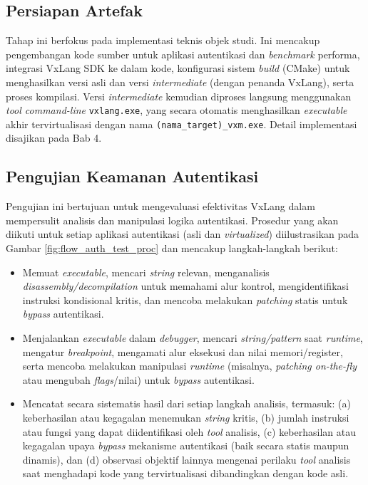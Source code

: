 \subsection{Persiapan Artefak}
Tahap ini berfokus pada implementasi teknis objek studi. Ini mencakup pengembangan kode sumber untuk aplikasi autentikasi dan \textit{benchmark} performa, integrasi VxLang SDK ke dalam kode, konfigurasi sistem \textit{build} (CMake) untuk menghasilkan versi asli dan versi \textit{intermediate} (dengan penanda VxLang), serta proses kompilasi. Versi \textit{intermediate} kemudian diproses langsung menggunakan \textit{tool command-line} \texttt{vxlang.exe}, yang secara otomatis menghasilkan \textit{executable} akhir tervirtualisasi dengan nama \texttt{(nama\_target)\_vxm.exe}. Detail implementasi disajikan pada Bab 4.

\subsection{Pengujian Keamanan Autentikasi}
Pengujian ini bertujuan untuk mengevaluasi efektivitas VxLang dalam mempersulit analisis dan manipulasi logika autentikasi. Prosedur yang akan diikuti untuk setiap aplikasi autentikasi (asli dan \textit{virtualized}) diilustrasikan pada Gambar \ref{fig:flow_auth_test_proc} dan mencakup langkah-langkah berikut:
\begin{itemize}
    \item {} Memuat \textit{executable}, mencari \textit{string} relevan, menganalisis \textit{disassembly/decompilation} untuk memahami alur kontrol, mengidentifikasi instruksi kondisional kritis, dan mencoba melakukan \textit{patching} statis untuk \textit{bypass} autentikasi.
    \item {} Menjalankan \textit{executable} dalam \textit{debugger}, mencari \textit{string/pattern} saat \textit{runtime}, mengatur \textit{breakpoint}, mengamati alur eksekusi dan nilai memori/register, serta mencoba melakukan manipulasi \textit{runtime} (misalnya, \textit{patching on-the-fly} atau mengubah \textit{flags}/nilai) untuk \textit{bypass} autentikasi.
      \item {} Mencatat secara sistematis hasil dari setiap langkah analisis, termasuk: (a) keberhasilan atau kegagalan menemukan \textit{string} kritis, (b) jumlah instruksi atau fungsi yang dapat diidentifikasi oleh \textit{tool} analisis, (c) keberhasilan atau kegagalan upaya \textit{bypass} mekanisme autentikasi (baik secara statis maupun dinamis), dan (d) observasi objektif lainnya mengenai perilaku \textit{tool} analisis saat menghadapi kode yang tervirtualisasi dibandingkan dengan kode asli.
\end{itemize}

